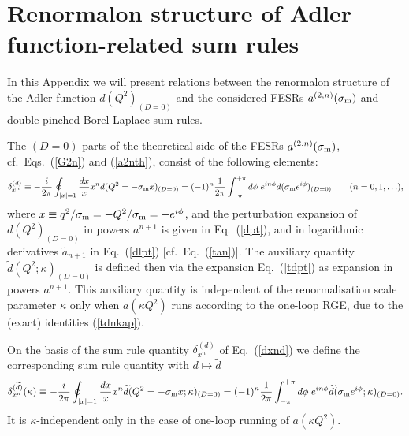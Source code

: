\documentclass[aps,nofootinbib,showkeys,noshowpacs,preprintnumbers,amsmath,amssymb]{revtex4}
\def\be{\begin{equation}}
\def\ee{\end{equation}}
\newcommand{\sm}{{\sigma_{\rm m}}}
\newcommand{\ta}{{\widetilde a}}
\newcommand{\td}{{\widetilde d}}
\begin{document}
\appendix

\section{Renormalon structure of Adler function-related sum rules}
\label{app:renSR}

In this Appendix we will present relations between the renormalon structure of the Adler function $d(Q^2)_{(D=0)}$ and the considered FESRs $a^{(2,n)}(\sm)$ and double-pinched Borel-Laplace sum rules.

The $(D=0)$ parts of the theoretical side of the FESRs $a^{(2,n)}(\sm)$, cf.~Eqs.~(\ref{G2n}) and (\ref{a2nth}), consist of the following elements:
\be
\delta_{x^n}^{(d)} \equiv - \frac{i}{2 \pi} \oint_{|x|=1} \frac{d x}{x} x^n d(Q^2=-\sm x)_{(D=0)}
= (-1)^n \frac{1}{2 \pi} \int_{-\pi}^{+\pi} d \phi \; e^{i n \phi} d(\sm e^{i \phi})_{(D=0)} \qquad (n=0,1,\ldots),
  \label{dxnd} \ee
where $x \equiv q^2/\sm = - Q^2/\sm = - e^{i \phi}$, and the perturbation expansion of $d(Q^2)_{(D=0)}$ in powers $a^{n+1}$ is given in Eq.~(\ref{dpt}), and in logarithmic derivatives $\ta_{n+1}$ in Eq.~(\ref{dlpt}) [cf.~Eq.~(\ref{tan})]. The auxiliary quantity $\td(Q^2;\kappa)_{(D=0)}$ is defined then via the expansion Eq.~(\ref{tdpt}) as expansion in powers $a^{n+1}$. This auxiliary quantity is independent of the renormalisation scale parameter $\kappa$ only when $a(\kappa Q^2)$ runs according to the one-loop RGE, due to the (exact) identities (\ref{tdnkap}).

On the basis of the sum rule quantity $\delta_{x^n}^{(d)}$ of Eq.~(\ref{dxnd}) we define the corresponding sum rule quantity with $d \mapsto \td$
\be
\delta_{x^n}^{(\td)}(\kappa) \equiv - \frac{i}{2 \pi} \oint_{|x|=1} \frac{d x}{x} x^n \td(Q^2=-\sm x; \kappa)_{(D=0)}
= (-1)^n  \frac{1}{2 \pi} \int_{-\pi}^{+\pi} d \phi \; e^{i n \phi} \td(\sm e^{i \phi};\kappa)_{(D=0)}.
\label{dxntd} \ee
It is $\kappa$-independent only in the case of one-loop running of $a(\kappa Q^2)$.
\end{document}
